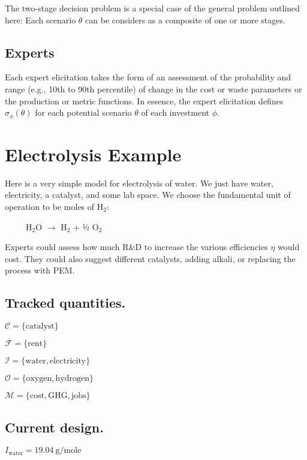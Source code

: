 \documentclass[letterpaper,10pt,english]{sphinxmanual}
\begin{document}
The two-stage decision problem is a special case of the general problem
outlined here: Each scenario \(\theta\) can be considers as a
composite of one or more stages.


\section{Experts}
\label{\detokenize{formulation:experts}}
Each expert elicitation takes the form of an assessment of the
probability and range (e.g., 10th to 90th percentile) of change in the
cost or waste parameters or the production or metric functions. In
essence, the expert elicitation defines \(\sigma_\phi(\theta)\) for
each potential scenario \(\theta\) of each investment \(\phi\).


\chapter{Electrolysis Example}
\label{\detokenize{example-electrolysis:electrolysis-example}}\label{\detokenize{example-electrolysis::doc}}
Here is a very simple model for electrolysis of water. We just have
water, electricity, a catalyst, and some lab space. We choose the
fundamental unit of operation to be moles of H$_{\text{2}}$:

     H$_{\text{2}}$O \(\rightarrow\) H$_{\text{2}}$ + ½ O$_{\text{2}}$

Experts could assess how much R\&D to increase the various efficiencies
\(\eta\) would cost. They could also suggest different catalysts,
adding alkali, or replacing the process with PEM.


\section{Tracked quantities.}
\label{\detokenize{example-electrolysis:tracked-quantities}}
\(\mathcal{C} = \{ \mathrm{catalyst} \}\)

\(\mathcal{F} = \{ \mathrm{rent} \}\)

\(\mathcal{I} = \{ \mathrm{water}, \mathrm{electricity} \}\)

\(\mathcal{O} = \{ \mathrm{oxygen}, \mathrm{hydrogen} \}\)

\(\mathcal{M} = \{ \mathrm{cost}, \mathrm{GHG}, \mathrm{jobs} \}\)


\section{Current design.}
\label{\detokenize{example-electrolysis:current-design}}
\(I_\mathrm{water} = 19.04~\mathrm{g/mole}\)
\end{document}

